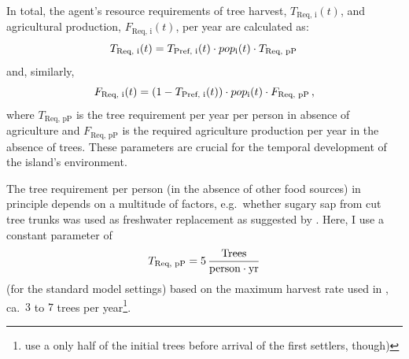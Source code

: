 In total, the agent's resource requirements of tree harvest, $T_\text{Req, i}(t)$, and agricultural production, $F_\text{Req, i}(t)$, per year are calculated as:
\begin{equation}
T_\text{Req, i}(t) = T_\text{Pref, i}(t) \cdot pop_{\rm i}(t) \cdot T_\text{Req, pP} \, 
\end{equation}
and, similarly, 
\begin{equation}
F_\text{Req, i}(t) = (1-T_\text{Pref, i}(t)) \cdot pop_{\rm i}(t) \cdot F_\text{Req, pP}\, , 
\end{equation}
where $T_\text{Req, pP}$ is the tree requirement per year per person in absence of agriculture and $F_\text{Req, pP}$ is the required agriculture production per year in the absence of trees.
These parameters are crucial for the temporal development of the island's environment. 

The tree requirement per person (in the absence of other food sources) in principle depends on a multitude of factors, e.g.\ whether sugary sap from cut tree trunks was used as freshwater replacement as suggested by \citet{Mieth2015}.
Here, I use a constant parameter of 
\begin{equation}
T_\text{Req, pP} = 5\, \frac{\text{Trees}}{\rm person\cdot yr}
\end{equation}
(for the standard model settings) based on the maximum harvest rate used in \citet{Brandt2015}, ca.\ $3$ to $7$ trees per year\footnote{\citet{Brandt2015} use a only half of the initial trees before arrival of the first settlers, though)}. 

